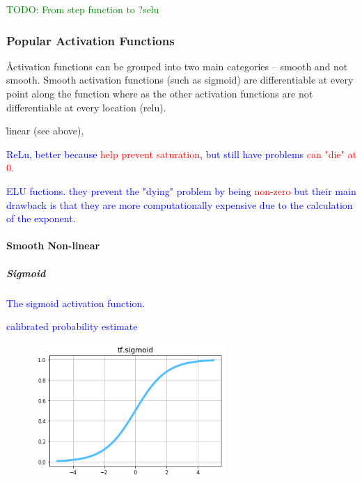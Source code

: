 \textcolor{green}{TODO: From step function to ?selu}

\subsubsection{Popular Activation Functions}

\r{Activation functions can be grouped into two main categories -- smooth and not smooth. Smooth activation functions (such as sigmoid) are differentiable at every point along the function where as the other activation functions are not differentiable at every location (relu).}



\r{linear (see above), }

\textcolor{blue}{ReLu, better because \textcolor{red}{help prevent saturation}, but still have problems \textcolor{red}{can "die" at 0.} }

\textcolor{blue}{ELU fuctions. they prevent the "dying" problem by being \textcolor{red}{non-zero} but their main drawback is that they are more computationally expensive due to the calculation of the exponent.}

\paragraph{Smooth Non-linear}

\subparagraph{Sigmoid}

\textcolor{blue}{The sigmoid activation function.}

\textcolor{blue}{calibrated probability estimate}


\begin{figure}
	\centering
	\includegraphics[width=0.65\textwidth]{./sync_imgs/act/smooth/sigmoid.png}
	\label{fig:act_smooth_sigmoid}
\end{figure}

